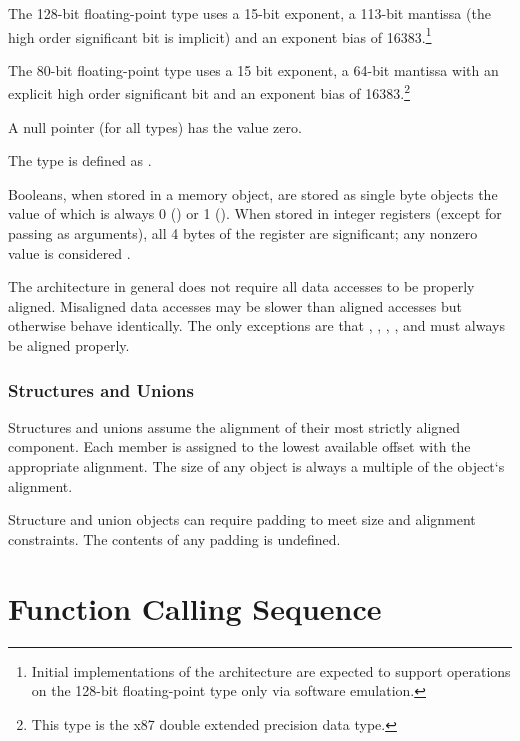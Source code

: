 The 128-bit floating-point type uses a 15-bit exponent, a 113-bit
mantissa (the high order significant bit is implicit) and an exponent
bias of 16383.\footnote{Initial implementations of the \xARCH
  architecture are expected to support operations on the
  128-bit floating-point  type only via software emulation.}

The 80-bit floating-point type uses a 15 bit exponent, a 64-bit mantissa
with an explicit high order significant bit and an exponent bias of
16383.\footnote{This type is the x87 double extended precision data
  type.} 

A null pointer (for all types) has the value zero.

The type  is defined as .

Booleans, when stored in a memory object, are stored as
single byte objects the value of which is always 0 () or 1
().  When stored in integer registers (except for passing
as arguments), all 4 bytes of the register are significant;
any nonzero value is considered .

\begin{sloppypar}
The \xARCH architecture in general
does not require all data accesses to be properly aligned.  Misaligned
data accesses may be slower than aligned accesses
but otherwise behave identically.  The only exceptions are that
, ,  ,
,  and  must always be aligned
properly.
\end{sloppypar}

\subsubsection{Structures and Unions}

Structures and unions assume the alignment of their most strictly
aligned component.  Each member is assigned to the lowest available
offset with the appropriate alignment.  The size of any object is always
a multiple of the object`s alignment.

Structure and union objects can require padding to meet size and
alignment constraints.  The contents of any padding is undefined.


\section{Function Calling Sequence}

